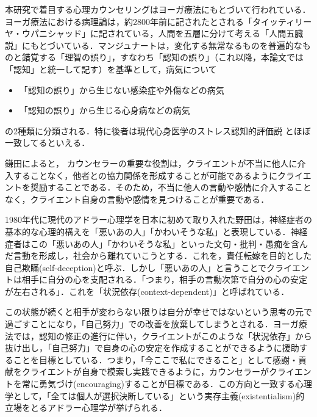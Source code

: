 \documentclass[shuuron]{kuee}
\begin{document}
本研究で着目する心理カウンセリングはヨーガ療法にもとづいて行われている．ヨーガ療法における病理論は，約2800年前に記されたとされる「タイッティリーヤ・ウパニシャッド」に記されている，人間を五層に分けて考える「人間五臓説」にもとづいている\cite{kimura}．マンジュナート\cite{manjunath}は，変化する無常なるものを普遍的なものと錯覚する「理智の誤り」，すなわち「認知の誤り」（これ以降，本論文では「認知」と統一して記す）を基準として，病気について
\begin{itemize}
  \item 「認知の誤り」から生じない感染症や外傷などの病気
  \item 「認知の誤り」から生じる心身病などの病気
\end{itemize}
の2種類に分類される．特に後者は現代心身医学のストレス認知的評価説%
\cite{Lazarus}とほぼ一致してるといえる\cite{Darshana}．


鎌田\cite{kamata2002}によると， カウンセラーの重要な役割は，クライエントが不当に他人に介入することなく，他者との協力関係を形成することが可能であるようにクライエントを奨励することである．そのため，不当に他人の言動や感情に介入することなく，クライエント自身の言動や感情を見つけることが重要である．

1980年代に現代のアドラー心理学を日本に初めて取り入れた野田\cite{zokad}は，神経症者の基本的な心理的構えを「悪いあの人」「かわいそうな私」と表現している．神経症者はこの「悪いあの人」「かわいそうな私」といった文句・批判・愚痴を含んだ言動を形成し，社会から離れていこうとする．これを，責任転嫁を目的とした自己欺瞞(self-deception)と呼ぶ\cite{Darshana}．しかし「悪いあの人」と言うことでクライエントは相手に自分の心を支配される．「つまり，相手の言動次第で自分の心の安定が左右される」．これを「状況依存(context-dependent)」と呼ばれている．

この状態が続くと相手が変わらない限りは自分が幸せではないという思考の元で過ごすことになり，「自己努力」での改善を放棄してしまうとされる．ヨーガ療法では，認知の修正の進行に伴い，クライエントがこのような「状況依存」から抜け出し，「自己努力」で自身の心の安定を作成することができるように援助することを目標としている．つまり，「今ここで私にできること」として感謝・貢献をクライエントが自身で模索し実践できるように，カウンセラーがクライエントを常に勇気づけ(encouraging)することが目標である．この方向と一致する心理学として，「全ては個人が選択決断している」という実存主義(existentialism)的立場をとるアドラー心理学が挙げられる．
\end{document}
